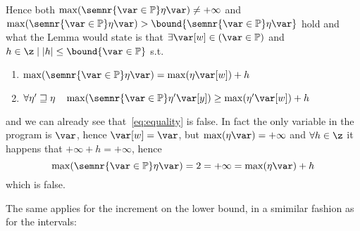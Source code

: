 \begin{remark}
  \noindent
  Hence both
  \(\max({\semnr{\var\in\mathbb{P}}\eta\var}) \neq +\infty\) and
  \(\max({\semnr{\var\in\mathbb{P}}\eta\var}) >
  \bound{\semnr{\var\in\mathbb{P}}\eta\var}\) hold and what the Lemma
  would state is that \(\exists \var[w] \in (\var\in \mathbb{P})\) and
  \(h \in \z \mid |h| \leq \bound{\var\in\mathbb{P}}\) s.t.
  \begin{enumerate}[label=(\roman*)]
  \item\label{eq:equality}
    \(\max(\semnr{\var\in \mathbb{P}}\eta\var) = \max(\eta\var[w]) +
    h\)
  \item
    \(\forall \eta'\sqsupseteq \eta \quad
    \max(\semnr{\var\in\mathbb{P}}\eta'\var[y]) \geq
    \max(\eta'\var[w]) + h\)
  \end{enumerate}
  and we can already see that~\ref{eq:equality} is false. In fact the
  only variable in the program is \(\var\), hence \(\var[w] = \var\),
  but \(\max(\eta\var) = +\infty\) and \(\forall h \in \z\) it happens
  that \(+\infty + h = +\infty\), hence
  \begin{equation*}
    \max(\semnr{\var\in\mathbb{P}}\eta\var) = 2 = +\infty = \max(\eta\var) + h
  \end{equation*}
  which is false.
\end{remark}

The same applies for the increment on the lower bound, in a smimilar
fashion as for the intervals:

